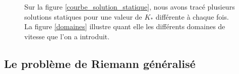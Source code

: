 \documentclass[11pt,a4paper]{article}
\begin{document}
\begin{figure}\centering
{}
\hspace*{1cm}
\caption{Sur la figure \ref{courbe_solution_statique}, nous avons tracé plusieurs solutions statiques pour une valeur de $K_*$ différente à chaque fois. La figure \ref{domaines} illustre quant elle les différents domaines de vitesse que l'on a introduit.}\label{figure_solution_statique}
\end{figure}

\subsection{Le problème de Riemann généralisé}
\end{document}
